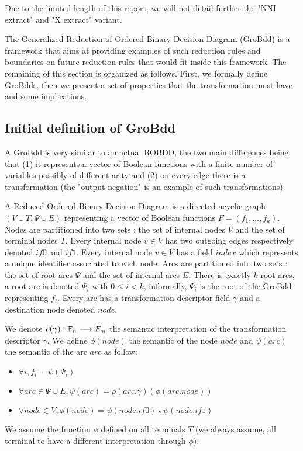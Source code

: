 \documentclass[a4paper,10pt]{article}
\begin{document}
Due to the limited length of this report, we will not detail further the "NNI extract" and "X extract" variant.


The Generalized Reduction of Ordered Binary Decision Diagram (GroBdd) is a framework that aims at providing examples of such reduction rules and boundaries on future reduction rules that would fit inside this framework.
The remaining of this section is organized as follows. First, we formally define GroBdds, then we present a set of properties that the transformation must have and some implications.

\subsection{Initial definition of GroBdd}

A GroBdd is very similar to an actual ROBDD, the two main differences being that (1) it represents a vector of Boolean functions with a finite number of variables possibly of different arity and (2) on every edge there is a transformation (the "output negation" is an example of such transformations).

A Reduced Ordered Binary Decision Diagram is a directed acyclic graph $(V\cup T, \Psi \cup E)$ representing a vector of Boolean functions $F=(f_1, ..., f_k)$.
Nodes are partitioned into two sets : the set of internal nodes $V$ and the set of terminal nodes $T$.
Every internal node $v\in V$ has two outgoing edges respectively denoted $if0$ and $if1$.
Every internal node $v\in V$ has a field $index$ which represents a unique identifier associated to each node.
Arcs are partitioned into two sets : the set of root arcs $\Psi$ and the set of internal arcs $E$.
There is exactly $k$ root arcs, a root arc is denoted $\Psi_i$ with $0\leq i < k$, informally, $\Psi_i$ is the root of the GroBdd representing $f_i$.
Every arc has a transformation descriptor field $\gamma$ and a destination node denoted $node$.

We denote $\rho(\gamma) : \mathbb{F}_n \longrightarrow F_m$ the semantic interpretation of the transformation descriptor $\gamma$.
We define $\phi(node)$ the semantic of the node $node$ and $\psi(arc)$ the semantic of the arc $arc$ as follow:\begin{itemize}
\item $\forall i, f_i = \psi(\Psi_i)$
\item $\forall arc \in \Psi \cup E, \psi(arc) = \rho(arc.\gamma)(\phi(arc.node))$
\item $\forall node \in V, \phi(node) = \psi(node.if0) \star \psi(node.if1)$
\end{itemize}
We assume the function $\phi$ defined on all terminals $T$ (we always assume, all terminal to have a different interpretation through $\phi$).
\end{document}
